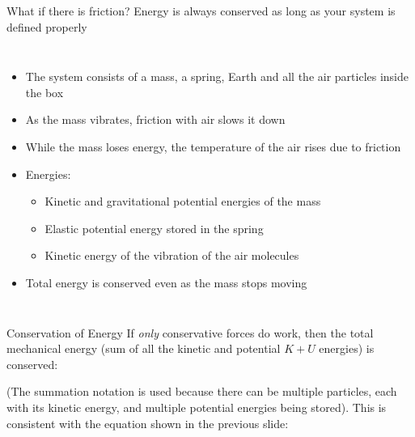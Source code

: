 \documentclass[12pt,compress,aspectratio=169]{beamer}
\begin{document}
\begin{frame}{What if there is friction?}
  Energy is always conserved as long as your system is defined properly
  \begin{columns}
    \begin{itemize}
    \item The system consists of a mass, a spring, Earth and all the air
      particles inside the box
    \item As the mass vibrates, friction with air slows it down
    \item While the mass loses energy, the temperature of the air rises due to
      friction
    \item Energies:
      \begin{itemize}
      \item Kinetic and gravitational potential energies of the mass
      \item Elastic potential energy stored in the spring
      \item Kinetic energy of the vibration of the air molecules
      \end{itemize}
    \item Total energy is conserved even as the mass stops moving
    \end{itemize}
  \end{columns}
\end{frame}



\begin{frame}{Conservation of Energy}
  If \emph{only} conservative forces do work, then the total mechanical energy
  (sum of all the kinetic and potential $K+U$ energies) is conserved:


  (The summation notation is used because there can be multiple particles,
  each with its kinetic energy, and multiple potential energies being stored).
  This is consistent with the equation shown in the previous slide:

\end{frame}
\end{document}
